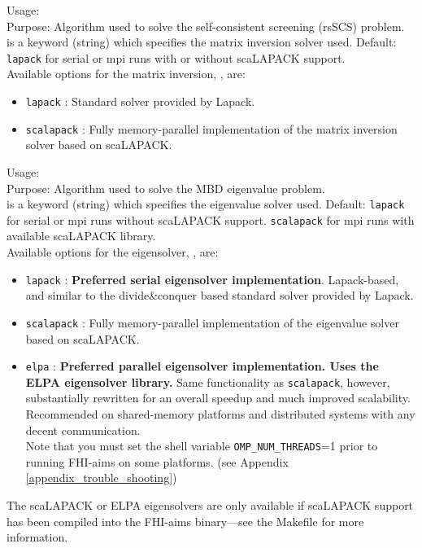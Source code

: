 {
  \noindent 
  Usage:   \\[1.0ex]
  Purpose: Algorithm used to solve the self-consistent screening (rsSCS) problem.\\[1.0ex]
   is a keyword (string) which specifies the matrix inversion solver
    used. Default: \texttt{lapack} for serial or mpi runs with or without scaLAPACK support. \\ 
}
Available options for the matrix inversion, , are:
\begin{itemize}
  \item \texttt{lapack} : Standard solver provided by Lapack.
  \item \texttt{scalapack} : Fully memory-parallel implementation of the matrix inversion solver based on scaLAPACK.
\end{itemize}



{
  \noindent 
  Usage:   \\[1.0ex]
  Purpose: Algorithm used to solve the MBD eigenvalue problem.\\[1.0ex]
   is a keyword (string) which specifies the eigenvalue solver
    used. Default: \texttt{lapack} for serial or mpi runs without scaLAPACK  
    support. \texttt{scalapack} for mpi runs with available scaLAPACK library. \\ 
}
Available options for the eigensolver, , are:
\begin{itemize}
  \item \texttt{lapack} : \textbf{Preferred 
    serial eigensolver implementation}. Lapack-based, and similar to the
    divide\&conquer based standard solver provided by Lapack.
  \item \texttt{scalapack} :  Fully memory-parallel implementation of 
    the eigenvalue solver based on scaLAPACK.
  \item \texttt{elpa} : \textbf{Preferred 
    parallel eigensolver implementation. Uses the ELPA eigensolver library.}
    Same functionality as \texttt{scalapack}, however, substantially 
    rewritten for an overall speedup and much improved scalability.
    Recommended on shared-memory platforms and distributed systems with any
    decent communication. \\
    Note that you must set the shell variable \texttt{OMP\_NUM\_THREADS}=1 
    prior to running FHI-aims on some platforms. 
    (see Appendix \ref{appendix_trouble_shooting})
\end{itemize}
The scaLAPACK or ELPA eigensolvers are only available if scaLAPACK
support has been compiled into the FHI-aims binary---see the Makefile
for more information. 

